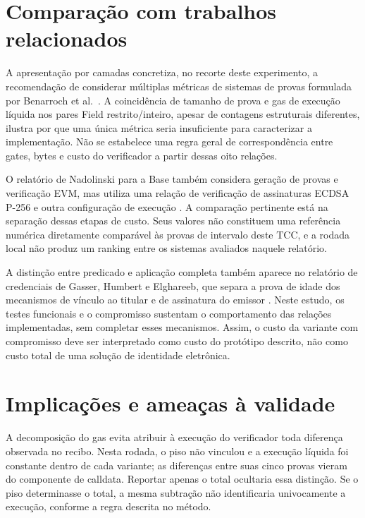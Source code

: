 \section{Comparação com trabalhos relacionados}

A apresentação por camadas concretiza, no recorte deste experimento, a recomendação de considerar múltiplas métricas de sistemas de provas formulada por Benarroch et al.\ \cite{zkbenchmark}. A coincidência de tamanho de prova e gas de execução líquida nos pares Field restrito/inteiro, apesar de contagens estruturais diferentes, ilustra por que uma única métrica seria insuficiente para caracterizar a implementação. Não se estabelece uma regra geral de correspondência entre gates, bytes e custo do verificador a partir dessas oito relações.

O relatório de Nadolinski para a Base também considera geração de provas e verificação EVM, mas utiliza uma relação de verificação de assinaturas ECDSA P-256 e outra configuração de execução \cite{basebenchmark}. A comparação pertinente está na separação dessas etapas de custo. Seus valores não constituem uma referência numérica diretamente comparável às provas de intervalo deste TCC, e a rodada local não produz um ranking entre os sistemas avaliados naquele relatório.

A distinção entre predicado e aplicação completa também aparece no relatório de credenciais de Gasser, Humbert e Elghareeb, que separa a prova de idade dos mecanismos de vínculo ao titular e de assinatura do emissor \cite{eidreport}. Neste estudo, os testes funcionais e o compromisso sustentam o comportamento das relações implementadas, sem completar esses mecanismos. Assim, o custo da variante com compromisso deve ser interpretado como custo do protótipo descrito, não como custo total de uma solução de identidade eletrônica.


\section{Implicações e ameaças à validade}

A decomposição do gas evita atribuir à execução do verificador toda diferença observada no recibo. Nesta rodada, o piso não vinculou e a execução líquida foi constante dentro de cada variante; as diferenças entre suas cinco provas vieram do componente de calldata. Reportar apenas o total ocultaria essa distinção. Se o piso determinasse o total, a mesma subtração não identificaria univocamente a execução, conforme a regra descrita no método.

